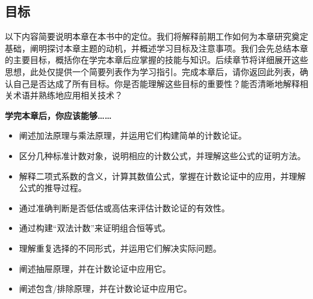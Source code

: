 
\subsection{目标}

以下内容简要说明本章在本书中的定位。我们将解释前期工作如何为本章研究奠定基础，阐明探讨本章主题的动机，并概述学习目标及注意事项。我们会先总结本章的主要目标，概括你在学完本章后应掌握的技能与知识。后续章节将详细展开这些思想，此处仅提供一个简要列表作为学习指引。完成本章后，请你返回此列表，确认自己是否达成了所有目标。你是否能理解这些目标的重要性？能否清晰地解释相关术语并熟练地应用相关技术？

\textbf{学完本章后，你应该能够……}

\begin{itemize}
    \item 阐述加法原理与乘法原理，并运用它们构建简单的计数论证。
    \item 区分几种标准计数对象，说明相应的计数公式，并理解这些公式的证明方法。
    \item 解释二项式系数的含义，计算其数值公式，掌握在计数论证中的应用，并理解公式的推导过程。
    \item 通过准确判断是否低估或高估来评估计数论证的有效性。
    \item 通过构建``双法计数''来证明组合恒等式。
    \item 理解重复选择的不同形式，并运用它们解决实际问题。
    \item 阐述抽屉原理，并在计数论证中应用它。
    \item 阐述包含/排除原理，并在计数论证中应用它。
\end{itemize}